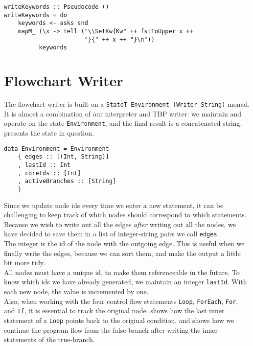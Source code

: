 \begin{lstlisting}[caption={Creating LaTeX macros for keywords.}, captionpos=b, label={writeKW}]
writeKeywords :: Pseudocode ()
writeKeywords = do
    keywords <- asks snd
    mapM_ (\x -> tell ("\\SetKw{Kw" ++ fstToUpper x ++
                       "}{" ++ x ++ "}\n"))
          keywords
\end{lstlisting}


\section{Flowchart Writer}

The flowchart writer is built on a \texttt{StateT Environment (Writer String)} monad. It is almost a combination of our interpreter and TBP writer: we maintain and operate on the state \texttt{Environment}, and the final result is a concatenated string.  presents the state in question. \\

\begin{lstlisting}[caption={The IBP writer's state.}, captionpos=b, label={The IBP monad's environment type}]
data Environment = Environment
    { edges :: [(Int, String)]
    , lastId :: Int
    , coreIds :: [Int]
    , activeBranches :: [String]
    }    
\end{lstlisting}

Since we update node ids every time we enter a new statement, it can be challenging to keep track of which nodes should correspond to which statements. Because we wish to write out all the edges \textit{after} writing out all the nodes, we have decided to save them in a list of integer-string pairs we call \texttt{edges}. \\

The integer is the id of the node with the outgoing edge. This is useful when we finally write the edges, because we can sort them, and make the output a little bit more tidy. \\

All nodes must have a unique id, to make them referenceable in the future. To know which ids we have already generated, we maintain an integer \texttt{lastId}. With each new node, the value is incremented by one. \\

Also, when working with the four control flow statements \texttt{Loop}, \texttt{ForEach}, \texttt{For}, and \texttt{If}, it is essential to track the original node.  shows how the last inner statement of a \texttt{Loop} points back to the original condition, and  shows how we continue the program flow from the false-branch after writing the inner statements of the true-branch. \\

